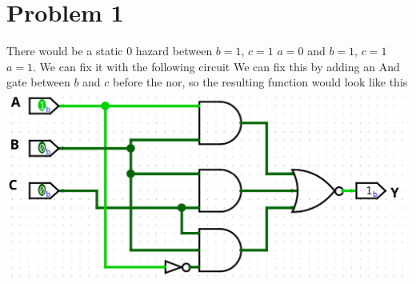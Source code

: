 \documentclass[12pt]{article}
\begin{document}
\section*{Problem 1}
There would be a static 0 hazard between $b=1$, $c=1$ $a=0$ and $b=1$, $c=1$ $a=1$. We can fix it with the following circuit
We can fix this by adding an And gate between $b$ and $c$ before the nor, so the resulting function would look like this
\includegraphics[scale=0.25]{Problem1.png}
\end{document}
